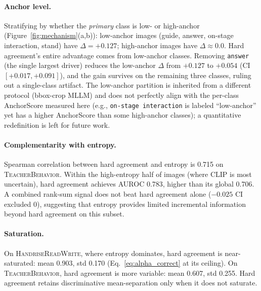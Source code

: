\documentclass[a4paper,fleqn]{cas-sc}
\newcommand{\tb}{\textsc{TeacherBehavior}}
\newcommand{\hrw}{\textsc{HandriseReadWrite}}
\begin{document}
\paragraph{Anchor level.}
Stratifying by whether the \emph{primary} class is low- or high-anchor \citep{llm_annotation} (Figure~\ref{fig:mechanism}(a,b)):
low-anchor images (guide, answer, on-stage interaction, stand) have $\Delta = +0.127$; high-anchor images have $\Delta \approx 0.0$.
Hard agreement's entire advantage comes from low-anchor classes.
Removing \texttt{answer} (the single largest driver) reduces the low-anchor $\Delta$ from $+0.127$ to $+0.054$ (CI~$[+0.017,+0.091]$), and the gain survives on the remaining three classes, ruling out a single-class artifact.
The low-anchor partition is inherited from a different protocol (bbox-crop MLLM) and does not perfectly align with the per-class AnchorScore measured here (e.g., \texttt{on-stage interaction} is labeled ``low-anchor'' yet has a higher AnchorScore than some high-anchor classes); a quantitative redefinition is left for future work.

\paragraph{Complementarity with entropy.}
Spearman correlation between hard agreement and entropy is 0.715 on \tb.
Within the high-entropy half of images (where CLIP is most uncertain), hard agreement achieves AUROC 0.783, higher than its global 0.706.
A combined rank-sum signal does not beat hard agreement alone ($-0.025$ CI excluded 0), suggesting that entropy provides limited incremental information beyond hard agreement on this subset.

\paragraph{Saturation.}
On \hrw{}, where entropy dominates, hard agreement is near-saturated: mean 0.903, std 0.170 (Eq.~\eqref{eq:alpha_correct} at its ceiling).
On \tb{}, hard agreement is more variable: mean 0.607, std 0.255.
Hard agreement retains discriminative mean-separation only when it does not saturate.
\end{document}
